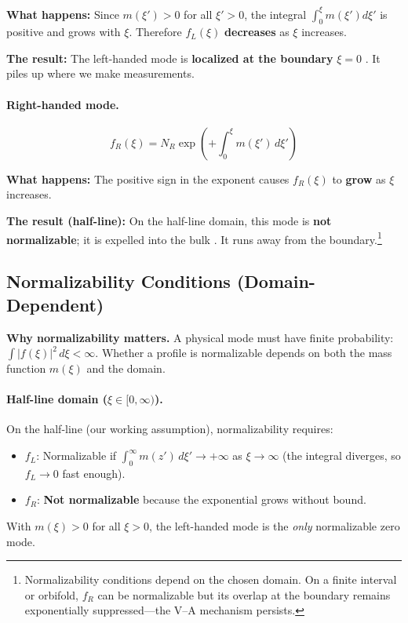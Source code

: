 \textbf{What happens:} Since $m(\xi') > 0$ for all $\xi' > 0$, the integral
$\int_0^\xi m(\xi') d\xi'$ is positive and grows with $\xi$. Therefore $f_L(\xi)$
\textbf{decreases} as $\xi$ increases.

\textbf{The result:} The left-handed mode is \textbf{localized at the boundary}
$\xi = 0$ \tagDc{}. It piles up where we make measurements.

\paragraph{Right-handed mode.}
\begin{equation}
    f_R(\xi) = N_R \exp\left(+\int_0^\xi m(\xi') \, d\xi'\right)
    \label{eq:ch9_fR_profile}
\end{equation}

\textbf{What happens:} The positive sign in the exponent causes $f_R(\xi)$ to
\textbf{grow} as $\xi$ increases.

\textbf{The result (half-line):} On the half-line domain, this mode is
\textbf{not normalizable}; it is expelled into the bulk \tagDc{}. It runs away
from the boundary.\footnote{Normalizability conditions depend on the chosen
domain. On a finite interval or orbifold, $f_R$ can be normalizable but its
overlap at the boundary remains exponentially suppressed---the V--A mechanism
persists. \tagDc{}}

\subsection{Normalizability Conditions (Domain-Dependent)}

\textbf{Why normalizability matters.} A physical mode must have finite probability:
$\int |f(\xi)|^2 \, d\xi < \infty$. Whether a profile is normalizable depends on
both the mass function $m(\xi)$ and the domain.

\paragraph{Half-line domain ($\xi \in [0, \infty)$).}
On the half-line (our working assumption), normalizability requires:
\begin{itemize}[nosep]
    \item $f_L$: Normalizable if $\int_0^\infty m(z')\,d\xi' \to +\infty$ as $\xi \to \infty$
          (the integral diverges, so $f_L \to 0$ fast enough).
    \item $f_R$: \textbf{Not normalizable} because the exponential grows without bound.
\end{itemize}
With $m(\xi) > 0$ for all $\xi > 0$, the left-handed mode is the \emph{only} normalizable
zero mode.

